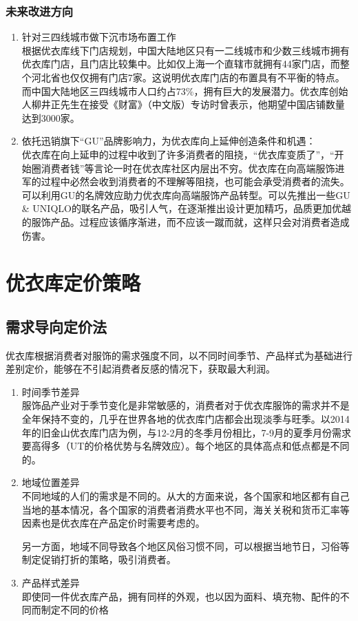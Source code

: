 \documentclass{xjtureport}
\begin{document}
\subsubsection{未来改进方向}
\begin{enumerate}
    \item 针对三四线城市做下沉市场布置工作\\
    根据优衣库线下门店规划，中国大陆地区只有一二线城市和少数三线城市拥有优衣库门店，且门店比较集中。比如仅上海一个直辖市就拥有44家门店，而整个河北省也仅仅拥有门店7家。这说明优衣库门店的布置具有不平衡的特点。而中国大陆地区三四线城市人口约占73\%\cite{ref14}，拥有巨大的发展潜力。优衣库创始人柳井正先生在接受《财富》（中文版）专访时曾表示，他期望中国店铺数量达到3000家。\cite{ref15}
    \item 依托迅销旗下“GU”品牌影响力，为优衣库向上延伸创造条件和机遇：
    \\优衣库在向上延申的过程中收到了许多消费者的阻挠，“优衣库变质了”，“开始圈消费者钱”等言论一时在优衣库社区内层出不穷。优衣库在向高端服饰进军的过程中必然会收到消费者的不理解等阻挠，也可能会承受消费者的流失。可以利用GU的名牌效应助力优衣库向高端服饰产品转型。可以先推出一些GU \& UNIQLO的联名产品，吸引人气，在逐渐推出设计更加精巧，品质更加优越的服饰产品。过程应该循序渐进，而不应该一蹴而就，这样只会对消费者造成伤害。
\end{enumerate}
\clearpage
\section{优衣库定价策略}

\subsection{需求导向定价法}
优衣库根据消费者对服饰的需求强度不同，以不同时间季节、产品样式为基础进行差别定价，能够在不引起消费者反感的情况下，获取最大利润。
\begin{enumerate}
    \item 时间季节差异\\
    服饰品产业对于季节变化是非常敏感的，消费者对于优衣库服饰的需求并不是全年保持不变的，几乎在世界各地的优衣库门店都会出现淡季与旺季。以2014年的旧金山优衣库门店为例，与12-2月的冬季月份相比，7-9月的夏季月份需求要高得多（UT的价格优势与名牌效应）。每个地区的具体高点和低点都是不同的。
    \item 地域位置差异\\
    不同地域的人们的需求是不同的。从大的方面来说，各个国家和地区都有自己当地的基本情况，各个国家的消费者消费水平也不同，海关关税和货币汇率等因素也是优衣库在产品定价时需要考虑的。
    
    另一方面，地域不同导致各个地区风俗习惯不同，可以根据当地节日，习俗等制定促销打折的策略，吸引消费者。
    \item 产品样式差异\\
    即使同一件优衣库产品，拥有同样的外观，也以因为面料、填充物、配件的不同而制定不同的价格
\end{enumerate}
\end{document}
